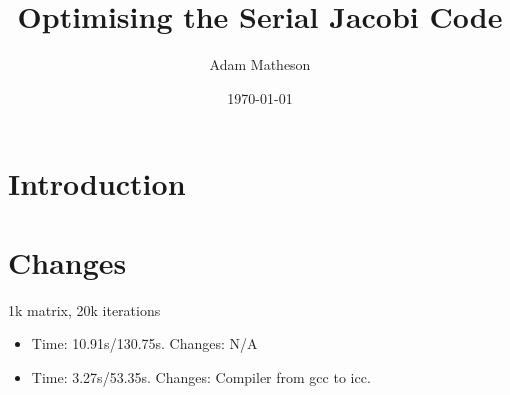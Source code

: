 \documentclass{article}
\begin{document}
\title{Optimising the Serial Jacobi Code}
\author{Adam Matheson}
\date{\today}

\section{Introduction}

\section{Changes}
1k matrix, 20k iterations
\begin{itemize}
\item Time: 10.91s/130.75s. Changes: N/A
\item Time: 3.27s/53.35s. Changes: Compiler from gcc to icc.

\end{itemize}
\end{document}

